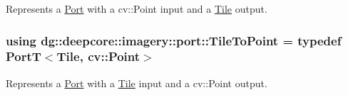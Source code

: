 Represents a \hyperlink{classdg_1_1deepcore_1_1_port}{Port} with a cv\+::\+Point input and a \hyperlink{structdg_1_1deepcore_1_1imagery_1_1_tile}{Tile} output. 

\subsubsection[{\texorpdfstring{Tile\+To\+Point}{TileToPoint}}]{\setlength{\rightskip}{0pt plus 5cm}using {\bf dg\+::deepcore\+::imagery\+::port\+::\+Tile\+To\+Point} = typedef {\bf PortT}$<${\bf Tile}, cv\+::\+Point$>$}\hypertarget{namespacedg_1_1deepcore_1_1imagery_1_1port_af86fdf47c5bc8b5bd694c08cb2f3b7ac}{}\label{namespacedg_1_1deepcore_1_1imagery_1_1port_af86fdf47c5bc8b5bd694c08cb2f3b7ac}


Represents a \hyperlink{classdg_1_1deepcore_1_1_port}{Port} with a \hyperlink{structdg_1_1deepcore_1_1imagery_1_1_tile}{Tile} input and a cv\+::\+Point output. 

